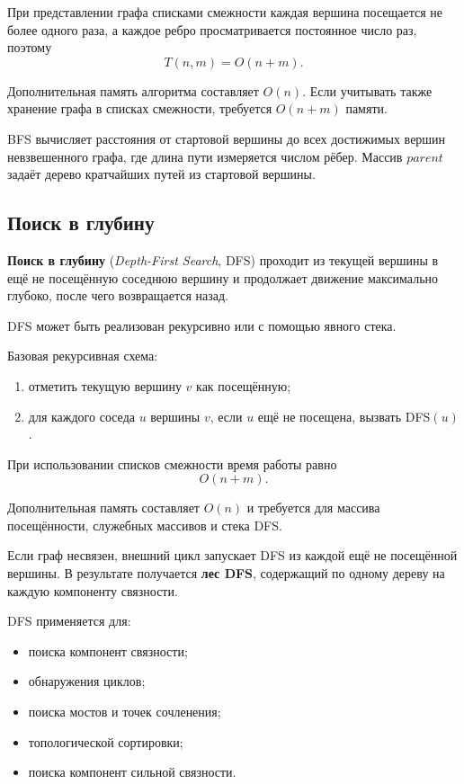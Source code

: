 При представлении графа списками смежности каждая вершина посещается не более одного раза, а каждое ребро просматривается постоянное число раз, поэтому
\[
T(n,m)=O(n+m).
\]

Дополнительная память алгоритма составляет $O(n)$. Если учитывать также хранение графа в списках смежности, требуется $O(n+m)$ памяти.

BFS вычисляет расстояния от стартовой вершины до всех достижимых вершин невзвешенного графа, где длина пути измеряется числом рёбер. Массив $parent$ задаёт дерево кратчайших путей из стартовой вершины.

\subsection{Поиск в глубину}

\textbf{Поиск в глубину} (\textit{Depth-First Search}, DFS) проходит из текущей вершины в ещё не посещённую соседнюю вершину и продолжает движение максимально глубоко, после чего возвращается назад.

DFS может быть реализован рекурсивно или с помощью явного стека.

Базовая рекурсивная схема:
\begin{enumerate}
	\item отметить текущую вершину $v$ как посещённую;
	\item для каждого соседа $u$ вершины $v$, если $u$ ещё не посещена, вызвать DFS$(u)$.
\end{enumerate}

При использовании списков смежности время работы равно
\[
O(n+m).
\]

Дополнительная память составляет $O(n)$ и требуется для массива посещённости, служебных массивов и стека DFS.

Если граф несвязен, внешний цикл запускает DFS из каждой ещё не посещённой вершины. В результате получается \textbf{лес DFS}, содержащий по одному дереву на каждую компоненту связности.

DFS применяется для:
\begin{itemize}
	\item поиска компонент связности;
	\item обнаружения циклов;
	\item поиска мостов и точек сочленения;
	\item топологической сортировки;
	\item поиска компонент сильной связности.
\end{itemize}


